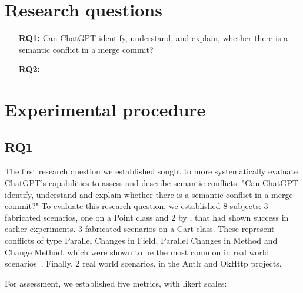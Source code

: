 \section{Research questions}

\begin{itemize}
  \item[\textbf{RQ1:}] Can ChatGPT identify, understand, and explain, whether
  there is a semantic conflict in a merge commit?

  \item[\textbf{RQ2:}] 
\end{itemize}

\section{Experimental procedure}

\subsection{RQ1}

The first research question we established sought to more systematically evaluate ChatGPT's capabilities to assess and describe semantic conflicts: "Can ChatGPT identify, understand and explain whether there is a semantic conflict in a merge commit?"
To evaluate this research question, we established 8 subjects:
3 fabricated scenarios, one on a Point class and 2 by \citet{kn:nuno}, that had shown success in earlier experiments.
3 fabricated scenarios on a Cart class. These represent conflicts of type Parallel Changes in Field, Parallel Changes in Method and Change Method, which were shown to be the most common in real world scenarios~\cite{kn:nuno}. Finally, 2 real world scenarios, in the Antlr and OkHttp projects.


For assessment, we established five metrics, with likert scales:

